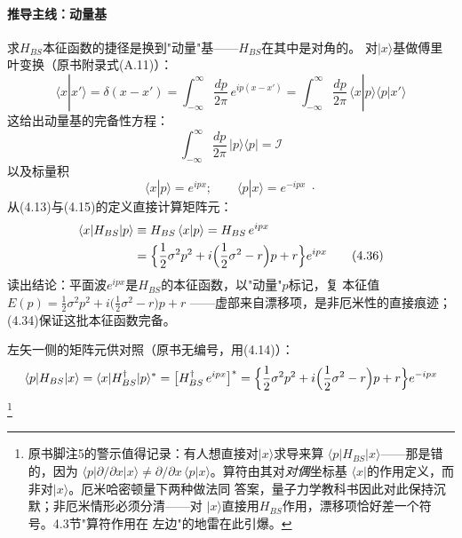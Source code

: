 \paragraph{推导主线：动量基}
求$H_{BS}$本征函数的捷径是换到"动量"基——$H_{BS}$在其中是对角的。
对$|x\rangle$基做傅里叶变换（原书附录式(A.11)）：
\begin{equation*}
\langle x|x'\rangle=\delta(x-x')
=\int_{-\infty}^{\infty}\frac{dp}{2\pi}\,e^{ip(x-x')}
=\int_{-\infty}^{\infty}\frac{dp}{2\pi}\,
\langle x|p\rangle\langle p|x'\rangle
\end{equation*}
这给出动量基的完备性方程：
\begin{equation*}
\int_{-\infty}^{\infty}\frac{dp}{2\pi}\,|p\rangle\langle p|=\mathcal{I}
\tag{4.34}
\end{equation*}
以及标量积
\begin{equation*}
\langle x|p\rangle=e^{ipx};\qquad
\langle p|x\rangle=e^{-ipx}\;\cdot
\tag{4.35}
\end{equation*}
从(4.13)与(4.15)的定义直接计算矩阵元：
\begin{align*}
\langle x|H_{BS}|p\rangle
&\equiv H_{BS}\,\langle x|p\rangle=H_{BS}\,e^{ipx}\\
&=\Bigl\{\frac{1}{2}\sigma^{2}p^{2}
+i\Bigl(\frac{1}{2}\sigma^{2}-r\Bigr)p+r\Bigr\}e^{ipx}
\tag{4.36}
\end{align*}
读出结论：平面波$e^{ipx}$是$H_{BS}$的本征函数，以"动量"$p$标记，复
本征值$E(p)=\frac{1}{2}\sigma^{2}p^{2}+i\bigl(\frac{1}{2}\sigma^{2}-r\bigr)p+r$
——虚部来自漂移项，是非厄米性的直接痕迹；(4.34)保证这批本征函数完备。

左矢一侧的矩阵元供对照（原书无编号，用(4.14)）：
\begin{equation*}
\langle p|H_{BS}|x\rangle
=\langle x|H_{BS}^{\dagger}|p\rangle^{*}
=\bigl[H_{BS}^{\dagger}\,e^{ipx}\bigr]^{*}
=\Bigl\{\frac{1}{2}\sigma^{2}p^{2}
+i\Bigl(\frac{1}{2}\sigma^{2}-r\Bigr)p+r\Bigr\}e^{-ipx}
\end{equation*}
\footnote{原书脚注5的警示值得记录：有人想直接对$|x\rangle$求导来算
$\langle p|H_{BS}|x\rangle$——那是错的，因为
$\langle p|\partial/\partial x|x\rangle\neq
\partial/\partial x\,\langle p|x\rangle$。算符由其对\emph{对偶}坐标基
$\langle x|$的作用定义，而非对$|x\rangle$。厄米哈密顿量下两种做法同
答案，量子力学教科书因此对此保持沉默；非厄米情形必须分清——对
$|x\rangle$直接用$H_{BS}$作用，漂移项恰好差一个符号。4.3节"算符作用在
左边"的地雷在此引爆。}

